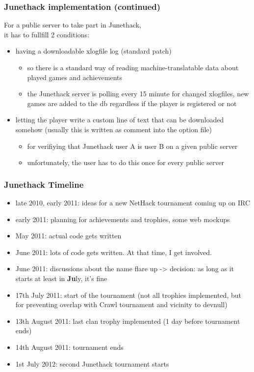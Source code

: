 \documentclass{beamer}
\begin{document}
\begin{frame}
\frametitle{Junethack implementation (continued)}
  For a public server to take part in Junethack,\\it has to fullfill 2 conditions:\pause
  \begin{itemize}[<+->]
    \item having a downloadable xlogfile log (standard patch)
    \begin{itemize}[<+->]
      \item so there is a standard way of reading machine-translatable data about played games and achievements
      \item the Junethack server is polling every 15 minute for changed xlogfiles, new games are added to the db regardless if the player is registered or not
    \end{itemize}
    \item letting the player write a custom line of text that can be downloaded somehow (usually this is written as comment into the option file)
    \begin{itemize}[<+->]
      \item for verifiying that Junethack user A is user B on a given public server
      \item unfortunately, the user has to do this once for every public server
    \end{itemize}
  \end{itemize}
\end{frame}

\begin{frame}
\frametitle{Junethack Timeline}
  \pause
  \begin{itemize}[<+->]
    \item late 2010, early 2011: ideas for a new NetHack tournament coming up on IRC
    \item early 2011: planning for achievements and trophies, some web mockups
    \item May 2011: actual code gets written
    \item June 2011: lots of code gets written. At that time, I get involved.
    \item June 2011: discussions about the name flare up -> decision: as long as it starts at least in \textbf{Ju}ly, it's fine
    \item 17th July 2011: start of the tournament (not all trophies implemented, but for preventing overlap with Crawl tournament and vicinity to devnull)
    \item 13th August 2011: last clan trophy implemented (1 day before tournament ends)
    \item 14th August 2011: tournament ends
    \item 1st July 2012: second Junethack tournament starts
  \end{itemize}
\end{frame}
\end{document}
